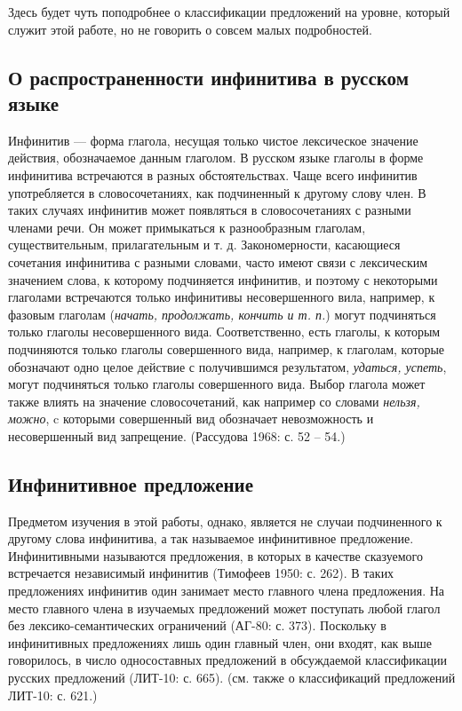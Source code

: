 Здесь будет чуть поподробнее о классификации предложений на уровне, который служит этой работе, но не говорить о совсем малых подробностей.

\subsection{О распространенности инфинитива в русском языке}

Инфинитив --- форма глагола, несущая только чистое лексическое значение действия, обозначаемое данным глаголом. В русском языке глаголы в форме инфинитива встречаются в разных обстоятельствах. Чаще всего инфинитив употребляется в словосочетаниях, как подчиненный к другому слову член. В таких случаях инфинитив может появляться в словосочетаниях с разными членами речи. Он может примыкаться к разнообразным глаголам, существительным, прилагательным и т. д. Закономерности, касающиеся сочетания инфинитива с разными словами, часто имеют связи с лексическим значением слова, к которому подчиняется инфинитив, и поэтому с некоторыми глаголами встречаются только инфинитивы несовершенного вила, например, к фазовым глаголам (\textit{начать, продолжать, кончить и т. п.}) могут подчиняться только глаголы несовершенного вида. Соответственно, есть глаголы, к которым подчиняются только глаголы совершенного вида, например, к глаголам, которые обозначают одно целое действие с получившимся результатом, \textit{удаться, успеть}, могут подчиняться только глаголы совершенного вида. Выбор глагола может также влиять на значение словосочетаний, как например со словами \textit{нельзя, можно}, c которыми совершенный вид обозначает невозможность и несовершенный вид запрещение. (Рассудова 1968: с. 52 -- 54.)

\subsection{Инфинитивное предложение}

Предметом изучения в этой работы, однако, является не случаи подчиненного к другому слова инфинитива, а так называемое инфинитивное предложение. Инфинитивными называются предложения, в которых в качестве сказуемого встречается независимый инфинитив (Тимофеев 1950: с. 262). В таких предложениях инфинитив один занимает место главного члена предложения. На место главного члена в изучаемых предложений может поступать любой глагол без лексико-семантических ограничений (АГ-80: с. 373). Поскольку в инфинитивных предложениях лишь один главный член, они входят, как выше говорилось, в число односоставных предложений в обсуждаемой классификации русских предложений (ЛИТ-10: с. 665). (см. также о классификаций предложений ЛИТ-10: с. 621.)

